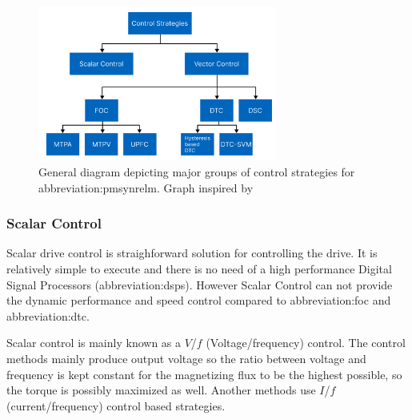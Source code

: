 \documentclass[a4paper, twoside, 11pt]{article}
\begin{document}
        \begin{figure}[htbp!]
            \centering
            \includegraphics[width=0.70\textwidth]{src/png/pmsynrelm-control-strategies.png}
            \caption{General diagram depicting major groups of control strategies for \gls{abbreviation:pmsynrelm}. Graph inspired by \cite{dwivedi-review-on-control-strategies-of-permanent-magnet-assisted-synchronous-reluctance-motor-drive}}
            \label{fig:pmsynrelm-control-strategies}
        \end{figure}

        \subsubsection{Scalar Control}
            Scalar drive control is straighforward solution for controlling the drive. It is relatively simple to execute and there is no need of a high performance Digital Signal Processors (\gls{abbreviation:dsp}s). However Scalar Control can not provide the dynamic performance and speed control compared to \gls{abbreviation:foc} and \gls{abbreviation:dtc}. \cite{dwivedi-review-on-control-strategies-of-permanent-magnet-assisted-synchronous-reluctance-motor-drive}\par
            Scalar control is mainly known as a $V$/$f$ (Voltage/frequency) control. The control methods mainly produce output voltage so the ratio between voltage and frequency is kept constant for the magnetizing flux to be the highest possible, so the torque is possibly maximized as well. Another methods use $I$/$f$ (current/frequency) control based strategies. \cite{heidari-a-review-of-synchronour-relucatence-motor-drive-advancements}
\end{document}
